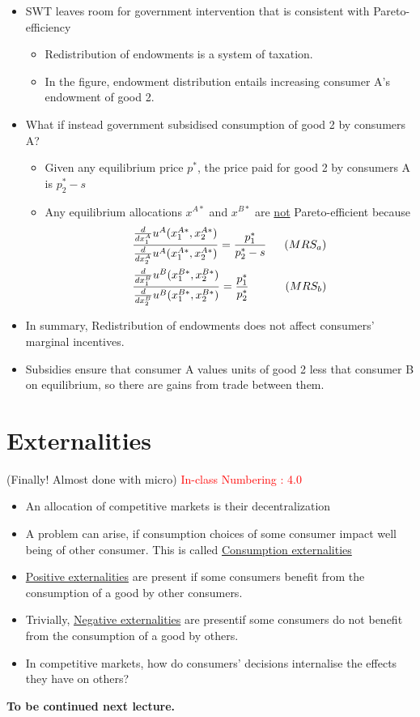 \documentclass[twoside]{article}
\begin{document}
\begin{itemize}
\item SWT leaves room for government intervention that is consistent with Pareto-efficiency
\begin{itemize}
\item Redistribution of endowments is a system of taxation. 
\item In the figure, endowment distribution entails increasing consumer A's endowment of good 2.
\end{itemize}
\item What if instead government subsidised consumption of good 2 by consumers A? 
\begin{itemize}
\item Given any equilibrium price \(p^*\), the price paid for good 2 by consumers A is \(p_2^* - s\) 
\item Any equilibrium allocations \(x^{A*}\) and \(x^{B*}\) are \underline{not} Pareto-efficient because 
\[\begin{aligned} & \frac{\frac{d}{dx_1^A} u^A(x_1^{A*}, x_2^{A*}) }{\frac{d}{dx_2^A} u^A(x_1^{A*}, x_2^{A*}) } = \frac{p_1^*}{p_2^* - s} & \hspace{0.2cm}(MRS_a)\\
& \frac{\frac{d}{dx_1^B} u^B(x_1^{B*}, x_2^{B*}) }{\frac{d}{dx_2^B} u^B(x_1^{B*}, x_2^{B*})} = \frac{p_1^*}{p_2^*} & \hspace{0.2cm} (MRS_b)
\end{aligned} \]

\end{itemize}
\item In summary, Redistribution of endowments does not affect consumers' marginal incentives. 
\item Subsidies ensure that consumer A values units of good 2 less that consumer B on equilibrium, so there are gains from trade between them.
\end{itemize}
\newpage
\section{Externalities} (Finally! Almost done with micro)
\textcolor{red}{In-class Numbering : 4.0}\\
\begin{itemize}
\item An allocation of competitive markets is their decentralization
\item A problem can arise, if consumption choices of some consumer impact well being of other consumer. This is called \underline{Consumption externalities}
\item  \underline{Positive externalities} are present if some consumers benefit from the consumption of a good by other consumers.  
\item Trivially, \underline{Negative externalities} are presentif some consumers do not benefit from the consumption of a good by others. 
\item In competitive markets, how do consumers' decisions internalise the effects they have on others?
\end{itemize}
\begin{center}
\textbf{To be continued next lecture.}
\end{center}
\end{document}
